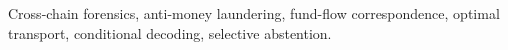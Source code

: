 \documentclass[journal]{IEEEtran}
\begin{document}
\begin{IEEEkeywords}
Cross-chain forensics, anti-money laundering, fund-flow correspondence, optimal transport, conditional decoding, selective abstention.
\end{IEEEkeywords}

\IEEEpeerreviewmaketitle











\end{document}
